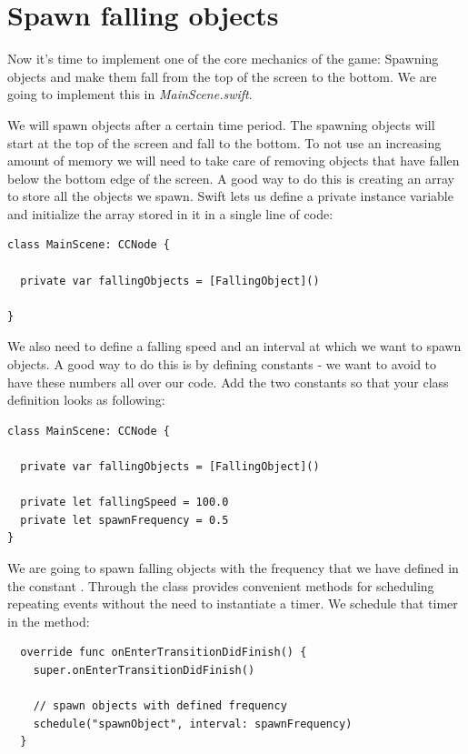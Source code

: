 \section{Spawn falling objects}
Now it's time to implement one of the core mechanics of the game: Spawning
objects and make them fall from the top of the screen to the bottom. We are
going to implement this in \textit{MainScene.swift}. 

We will spawn objects after a certain time period. The spawning objects will
start at the top of the screen and fall to the bottom. To not use an
increasing amount of memory we will need to take care of removing objects that
have fallen below the bottom edge of the screen. A good way to do this is
creating an array to store all the objects we spawn. Swift lets us define a
private instance variable and initialize the array stored in it in a single line
of code:

\begin{lstlisting}
class MainScene: CCNode {

  private var fallingObjects = [FallingObject]()

}
\end{lstlisting}

We also need to define a falling speed and an interval at which we want to spawn
objects. A good way to do this is by defining constants - we want to avoid to
have these numbers all over our code. Add the two constants so that your class
definition looks as following:

\begin{lstlisting}
class MainScene: CCNode {

  private var fallingObjects = [FallingObject]()

  private let fallingSpeed = 100.0
  private let spawnFrequency = 0.5
}
\end{lstlisting}

We are going to spawn falling objects with the frequency that we have defined in
the constant . Through the  class
\cocos{} provides convenient methods for scheduling repeating events without the
need to instantiate a timer. We schedule that timer in the
 method:

\begin{lstlisting}
  override func onEnterTransitionDidFinish() {
    super.onEnterTransitionDidFinish()
    
    // spawn objects with defined frequency
    schedule("spawnObject", interval: spawnFrequency)
  }
\end{lstlisting}

